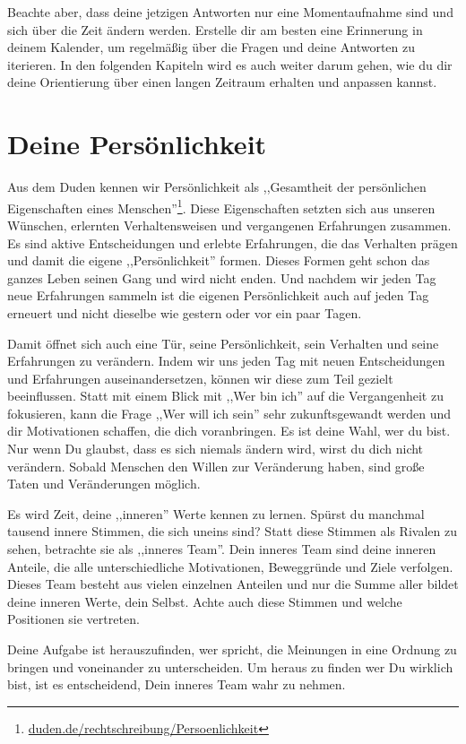 \documentclass[../Lebensziel.tex]{subfiles}
\begin{document}
Beachte aber, dass deine jetzigen Antworten nur eine Momentaufnahme sind und sich über die Zeit ändern werden. Erstelle dir am besten eine Erinnerung in deinem Kalender, um regelmäßig über die Fragen und deine Antworten zu iterieren.
In den folgenden Kapiteln wird es auch weiter darum gehen, wie du dir deine Orientierung über einen langen Zeitraum erhalten und anpassen kannst.

\section{Deine Persönlichkeit}
Aus dem Duden kennen wir Persönlichkeit als ,,Gesamtheit der persönlichen Eigenschaften eines Menschen''\footnote{\href{https://www.duden.de/rechtschreibung/Persoenlichkeit}{duden.de/rechtschreibung/Persoenlichkeit}}. Diese Eigenschaften setzten sich aus unseren Wünschen, erlernten Verhaltensweisen und vergangenen Erfahrungen zusammen.
Es sind aktive Entscheidungen und erlebte Erfahrungen, die das Verhalten prägen und damit die eigene ,,Persönlichkeit'' formen. Dieses Formen geht schon das ganzes Leben seinen Gang und wird nicht enden. Und nachdem wir jeden Tag neue Erfahrungen sammeln ist die eigenen Persönlichkeit auch auf jeden Tag erneuert und nicht dieselbe wie gestern oder vor ein paar Tagen.

Damit öffnet sich auch eine Tür, seine Persönlichkeit, sein Verhalten und seine Erfahrungen zu verändern. Indem wir uns jeden Tag mit neuen Entscheidungen und Erfahrungen auseinandersetzen, können wir diese zum Teil gezielt beeinflussen. Statt mit einem Blick mit ,,Wer bin ich'' auf die Vergangenheit zu fokusieren, kann die Frage ,,Wer will ich sein'' sehr zukunftsgewandt werden und dir Motivationen schaffen, die dich voranbringen. Es ist deine Wahl, wer du bist.
Nur wenn Du glaubst, dass es sich niemals ändern wird, wirst du dich nicht verändern. Sobald Menschen den Willen zur Veränderung haben, sind große Taten und Veränderungen möglich.

Es wird Zeit, deine ,,inneren'' Werte kennen zu lernen. Spürst du manchmal tausend innere Stimmen, die sich uneins sind? Statt diese Stimmen als Rivalen zu sehen, betrachte sie als ,,inneres Team''. Dein inneres Team sind deine inneren Anteile, die alle unterschiedliche Motivationen, Beweggründe und Ziele verfolgen. Dieses Team besteht aus vielen einzelnen Anteilen und nur die Summe aller bildet deine inneren Werte, dein Selbst. Achte auch diese Stimmen und welche Positionen sie vertreten.

Deine Aufgabe ist herauszufinden, wer spricht, die Meinungen in eine Ordnung zu bringen und voneinander zu unterscheiden.
Um heraus zu finden wer Du wirklich bist, ist es entscheidend, Dein inneres Team wahr zu nehmen.
\end{document}
